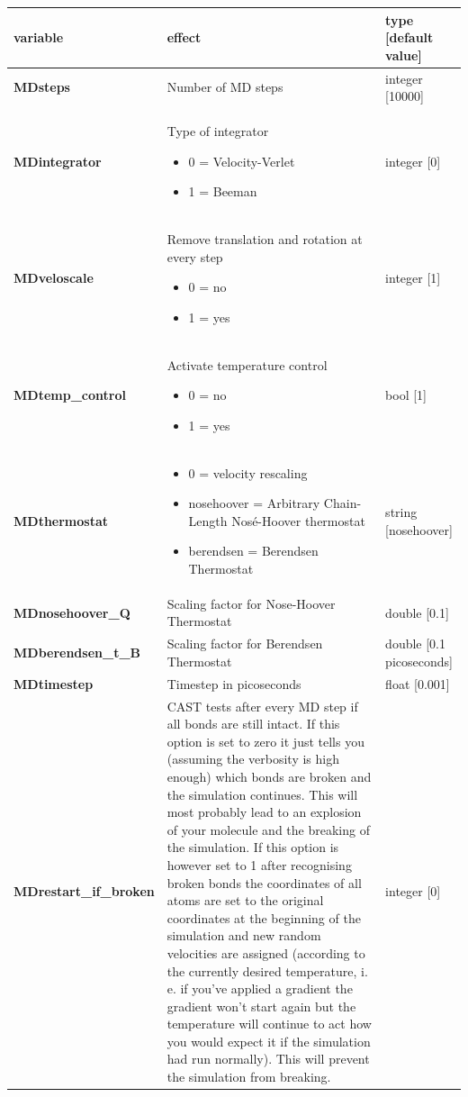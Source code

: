 \documentclass[10pt,a4paper]{article} %
\begin{document}
	\begin{longtable}{|p{4cm}|p{4.5cm}|p{3cm}|}
		variable & effect & type [default value] \\
		\hline
		\textbf{MDsteps} & Number of MD steps & integer [10000] \\
		\textbf{MDintegrator} & Type of integrator \begin{itemize}
			\item 0  = Velocity-Verlet \item 1 = Beeman
			\end{itemize} 	
		& integer [0] \\
		\textbf{MDveloscale} & Remove translation and rotation at every step\begin{itemize} \item 0 = no \item 1 = yes\end{itemize}& integer [1] \\
		\textbf{MDtemp\_control} & Activate temperature control\begin{itemize} \item 0 = no \item 1 = yes\end{itemize}& bool [1] \\
		\textbf{MDthermostat} & \begin{itemize} \item 0 = velocity rescaling \item nosehoover = Arbitrary Chain-Length Nosé-Hoover thermostat \item berendsen = Berendsen Thermostat\end{itemize} & string [nosehoover] \\
		\textbf{MDnosehoover\_Q} & Scaling factor for Nose-Hoover Thermostat & double [0.1] \\
		\textbf{MDberendsen\_t\_B} & Scaling factor for Berendsen Thermostat & double [0.1 picoseconds] \\
		\textbf{MDtimestep} & Timestep in picoseconds & float [0.001] \\
		\textbf{MDrestart\_if\_broken} & CAST tests after every MD step if all bonds are still intact. If this option is set to zero it just tells you (assuming the verbosity is high enough) which bonds are broken and the simulation continues. This will most probably lead to an explosion of your molecule and the breaking of the simulation. If this option is however set to 1 after recognising broken bonds the coordinates of all atoms are set to the original coordinates at the beginning of the simulation and new random velocities are assigned (according to the currently desired temperature, i.\,e. if you've applied a gradient the gradient won't start again but the temperature will continue to act how you would expect it if the simulation had run normally). This will prevent the simulation from breaking. & integer [0] \\

\end{longtable}
\end{document}
